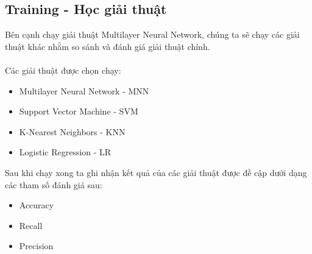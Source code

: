 \subsection{Training - Học giải thuật}
Bên cạnh chạy giải thuật Multilayer Neural Network, chúng ta sẽ chạy các giải 
thuật khác nhằm so sánh và đánh giá giải thuật chính.\\\\
Các giải thuật được chọn chạy:\\
\begin{itemize}
\item Multilayer Neural Network - MNN
\item Support Vector Machine - SVM
\item K-Nearest Neighbors - KNN
\item Logistic Regression - LR
\end{itemize}
Sau khi chạy xong ta ghi nhận kết quả của các giải thuật được đề cập dưới dạng 
các tham số đánh giá sau:\\
\begin{itemize}
\item Accuracy
\item Recall
\item Precision
\end{itemize}
